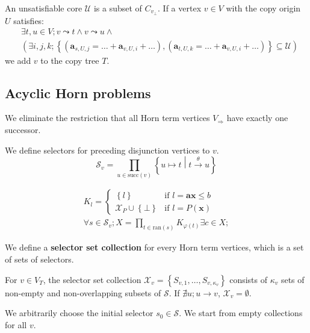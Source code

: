 \documentclass[a4paper,12pt]{article}
\newcommand{\edgel}[3]{#1\xrightarrow{#2}#3}
\begin{document}
An unsatisfiable core $\mathcal{U}$ is a subset of $C_{v_\bot}$.
If a vertex $v \in V$ with the copy origin $U$ satisfies:
\begin{align*}
& \exists t, u \in V; v \leadsto t \wedge v \leadsto u \wedge \\
& \left( \exists i, j, k;
\left\lbrace \left( \mathbf{a}_{s,U,j} = \ldots + \mathbf{a}_{v,U,i} + \ldots \right),
\left( \mathbf{a}_{t,U,k} = \ldots + \mathbf{a}_{v,U,i} + \ldots \right)
\right\rbrace \subseteq \mathcal{U} \right)
\end{align*}
we add $v$ to the copy tree $T$.

\subsection{Acyclic Horn problems}

We eliminate the restriction that all Horn term vertices
$V_\Rightarrow$ have exactly one successor.

We define selectors for preceding disjunction vertices to $v$.
\[ \mathcal{S}_v = \prod_{u \in \mathrm{succ}(v)} \left\lbrace u \mapsto t \middle| \edgel{t}{\theta}{u} \right\rbrace \]

\begin{align*}
K_l = \begin{cases}
\left\lbrace l \right\rbrace & \mbox{if } l = \mathbf{a} \mathbf{x} \leq b \\
\mathcal{X}_P \cup \left\lbrace \bot \right\rbrace
& \mbox{if } l = P(\mathbf{x})
\end{cases} \\
\forall s \in \mathcal{S}_v;
X = \prod_{t \in \mathrm{ran}(s)} K_{\varphi(t)}
\exists c \in X;
\end{align*}

We define a \textbf{selector set collection} \cite{albarghouthi13} for
every Horn term vertices, which is a set of sets of selectors.

For $v \in V_T$, the selector set collection $\mathcal{X}_v =
\left\lbrace S_{v,1}, \ldots, S_{v,\kappa_v} \right\rbrace$ consists
of $\kappa_v$ sets of non-empty and non-overlapping subsets of
$\mathcal{S}$. If $\nexists u; u \rightarrow v$, $\mathcal{X}_v =
\emptyset$.

We arbitrarily choose the initial selector $s_0 \in \mathcal{S}$. We
start from empty collections for all $v$.



\end{document}
